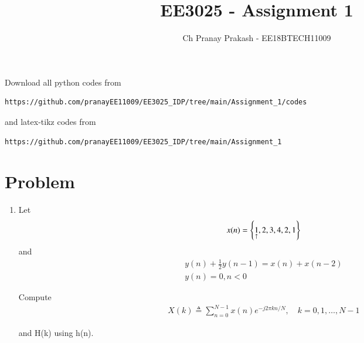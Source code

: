 \documentclass[journal,12pt,twocolumn]{IEEEtran}
\renewcommand\thesection{\arabic{section}}
\begin{document}
     \def\rightbox#1{\makebox[0in][r]{#1}}
     \def\centbox#1{\makebox[0in]{#1}}
     \def\topbox#1{\raisebox{-\baselineskip}[0in][0in]{#1}}
     \def\midbox#1{\raisebox{-0.5\baselineskip}[0in][0in]{#1}}
\vspace{3cm}
\title{EE3025 - Assignment 1}
\author{Ch Pranay Prakash - EE18BTECH11009}
\maketitle
\newpage
\bigskip
\renewcommand{\thefigure}{\theenumi}
\renewcommand{\thetable}{\theenumi}
Download all python codes from 
\begin{lstlisting}
https://github.com/pranayEE11009/EE3025_IDP/tree/main/Assignment_1/codes
\end{lstlisting}
%
and latex-tikz codes from 
%
\begin{lstlisting}
https://github.com/pranayEE11009/EE3025_IDP/tree/main/Assignment_1
\end{lstlisting}
\section{Problem}
\begin{enumerate}[label=\thesection.\arabic*.,ref=\thesection.\theenumi]
\item
Let
\begin{align}
    x(n) = \left\{\underset{\uparrow}{1},2,3,4,2,1\right\} 
\end{align}
and 
\begin{multline}
    y(n) + \frac{1}{2}y(n-1) = x(n) + x(n-2) \label{eq:1.0.2}
    \\
    y(n) = 0 , n<0
\end{multline}

Compute
\begin{align}
    X(k) \triangleq \sum_{n=0}^{N-1}x(n)e^{-j2\pi kn/N},
    \quad k=0,1, \ldots, N-1
\end{align}

and H(k) using h(n).\\
\end{enumerate}
\end{document}

